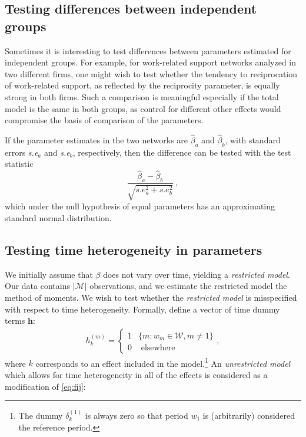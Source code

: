 \documentclass[a4paper,fleqn]{article}
\newcommand{\+}{\, + \,}
\begin{document}
{\newpage
\subsection{Testing differences between independent groups}

Sometimes it is interesting to test differences between parameters
estimated for independent groups. For example, for work-related support networks
analyzed in two different firms, one might wish to test whether the
tendency to reciprocation of work-related support, as reflected by the reciprocity parameter,
is equally strong in both firms.
Such a comparison is meaningful especially if the total model is the same in
both groups, as control for different other effects would compromise
the basis of comparison of the parameters.

If the parameter estimates in the two networks are $\hat\beta_a$ and $\hat\beta_b$,
with standard errors \textit{s.e}$_a$ and  \textit{s.e}$_b$, respectively,
then the difference can be tested with the test statistic
\begin{equation}
    \frac{\hat\beta_a  - \hat\beta_b}{\sqrt{s.e_a^2 + s.e_b^2}} \ ,
\end{equation}
which under the null hypothesis of equal parameters has an approximating
standard normal distribution.

\newpage
\subsection{Testing time heterogeneity in parameters}
We initially assume that $\beta$ does not vary over time, yielding a \emph{restricted model}. Our data contains $|\mathcal{M}|$ observations, and we estimate the restricted model the method of moments. We wish to test whether the \emph{restricted model} is misspecified with respect to time heterogeneity. Formally, define a vector of time dummy terms $\mathbf{h}$:
\begin{align}
h_k^{(m)}=\left\{
\begin{array}{ll}
1& \{m : w_m \in \mathcal{W}, m \neq 1\}\\
0& \mbox{~elsewhere~}
\end{array}
\right . ,
\end{align}
where $k$ corresponds to an effect included in the model.\footnote{The dummy $\delta_k^{(1)}$ is always zero so that period $w_1$ is (arbitrarily) considered the reference period.} An \emph{unrestricted model} which allows for time heterogeneity in all of the effects is considered as a modification of \eqref{eq:fij}:

}
\end{document}
